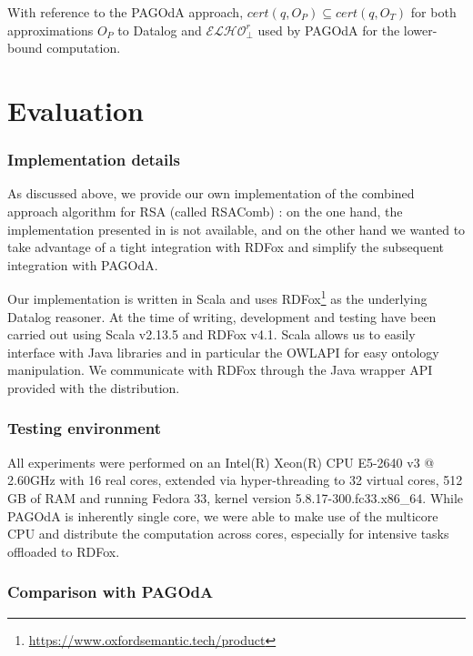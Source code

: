 \documentclass[runningheads]{llncs}
\newcommand{\elho}{$\mathcal{ELHO}^r_\bot$\xspace}
\newcommand{\pagoda}{\mbox{PAGOdA}\xspace}
\newcommand{\rdfox}{\mbox{RDFox}\xspace}
\newcommand{\datalog}{\mbox{Datalog}\xspace}
\newcommand{\rsacomb}{\mbox{RSAComb}\xspace}
\begin{document}
With reference to the \pagoda approach, $\textit{cert}(q,O_P) \subseteq \textit{cert}(q,O_T)$ for both approximations $O_P$ to \datalog and \elho used by \pagoda for the lower-bound computation.

\section{Evaluation}\label{sec:evaluation}

\subsubsection{Implementation details}\label{sssec:implementation_details}

As discussed above, we provide our own implementation of the combined approach algorithm for RSA (called \rsacomb) \cite{igne2021a}: on the one hand, the implementation presented in \cite{feier2015} is not available, and on the other hand we wanted to take advantage of
a tight integration with \rdfox and simplify the subsequent integration with \pagoda.

Our implementation is written in Scala and uses \rdfox\footnote{\url{https://www.oxfordsemantic.tech/product}} as the underlying \datalog reasoner.
At the time of writing, development and testing have been carried out using Scala v2.13.5 and \rdfox v4.1.
Scala allows us to easily interface with Java libraries and in particular the OWLAPI \cite{horridge2011} for easy ontology manipulation.
We communicate with \rdfox through the Java wrapper API provided with the distribution.

\subsubsection{Testing environment}\label{sssec:testing_environment}

All experiments were performed on an Intel(R) Xeon(R) CPU E5-2640 v3 @ 2.60GHz with 16 real cores, extended via hyper-threading to 32 virtual cores, 512 GB of RAM and running Fedora 33, kernel version 5.8.17-300.fc33.x86\_64.
While \pagoda is inherently single core, we were able to make use of the multicore CPU and distribute the computation across cores, especially for intensive tasks offloaded to \rdfox.

\subsubsection{Comparison with \pagoda}\label{sssec:comparison_with_pagoda}
\end{document}
